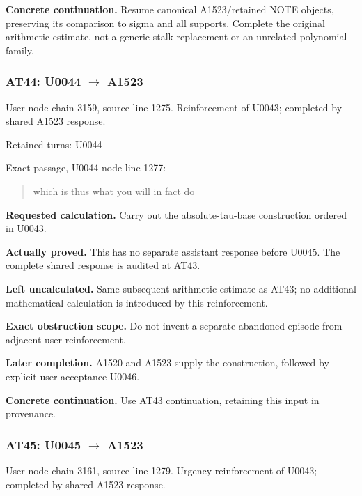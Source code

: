 \textbf{Concrete continuation.} Resume canonical A1523/retained NOTE
objects, preserving its comparison to sigma and all supports. Complete
the original arithmetic estimate, not a generic-stalk replacement or an
unrelated polynomial family.

\subsubsection{\texorpdfstring{AT44: U0044
\allowbreak{}\ensuremath{→}\allowbreak{}
A1523}{AT44: U0044  A1523}}\label{at44-u0044-a1523}

User node \protect{} chain
3159, source line 1275. Reinforcement of U0043; completed by shared
A1523 response.

Retained turns: U0044
\protect{}

Exact passage, U0044 node
\protect{} line 1277:

\begin{quote}
which is thus what you will in fact do
\end{quote}

\textbf{Requested calculation.} Carry out the absolute-tau-base
construction ordered in U0043.

\textbf{Actually proved.} This has no separate assistant response before
U0045. The complete shared response is audited at AT43.

\textbf{Left uncalculated.} Same subsequent arithmetic estimate as AT43;
no additional mathematical calculation is introduced by this
reinforcement.

\textbf{Exact obstruction scope.} Do not invent a separate abandoned
episode from adjacent user reinforcement.

\textbf{Later completion.} A1520 and A1523 supply the construction,
followed by explicit user acceptance U0046.

\textbf{Concrete continuation.} Use AT43 continuation, retaining this
input in provenance.

\subsubsection{\texorpdfstring{AT45: U0045
\allowbreak{}\ensuremath{→}\allowbreak{}
A1523}{AT45: U0045  A1523}}\label{at45-u0045-a1523}

User node \protect{} chain
3161, source line 1279. Urgency reinforcement of U0043; completed by
shared A1523 response.

